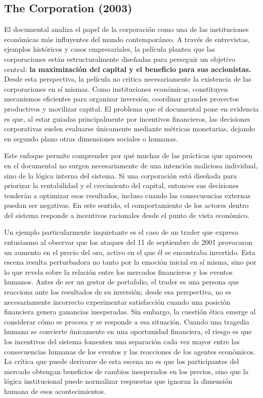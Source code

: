 \subsection{The Corporation (2003)}

El documental analiza el papel de la corporación como una de las instituciones económicas más influyentes del mundo contemporáneo. A través de entrevistas, ejemplos históricos y casos empresariales, la película plantea que las corporaciones están estructuralmente diseñadas para perseguir un objetivo central: \textbf{la maximización del capital y el beneficio para sus accionistas.} Desde esta perspectiva, la película no critica necesariamente la existencia de las corporaciones en sí mismas. Como instituciones económicas, constituyen mecanismos eficientes para organizar inversión, coordinar grandes proyectos productivos y movilizar capital. El problema que el documental pone en evidencia es que, al estar guiadas principalmente por incentivos financieros, las decisiones corporativas suelen evaluarse únicamente mediante métricas monetarias, dejando en segundo plano otras dimensiones sociales o humanas.

Este enfoque permite comprender por qué muchas de las prácticas que aparecen en el documental no surgen necesariamente de una intención maliciosa individual, sino de la lógica interna del sistema. Si una corporación está diseñada para priorizar la rentabilidad y el crecimiento del capital, entonces sus decisiones tenderán a optimizar esos resultados, incluso cuando las consecuencias externas puedan ser negativas. En este sentido, el comportamiento de los actores dentro del sistema responde a incentivos racionales desde el punto de vista económico.

Un ejemplo particularmente inquietante es el caso de un trader que expresa entusiasmo al observar que los ataques del 11 de septiembre de 2001 provocaron un aumento en el precio del oro, activo en el que él se encontraba invertido. Esta escena resulta perturbadora no tanto por la emoción inicial en sí misma, sino por lo que revela sobre la relación entre los mercados financieros y los eventos humanos. Antes de ser un gestor de portafolio, el trader es una persona que reacciona ante los resultados de su inversión; desde esa perspectiva, no es necesariamente incorrecto experimentar satisfacción cuando una posición financiera genera ganancias inesperadas. Sin embargo, la cuestión ética emerge al considerar cómo se procesa y se responde a esa situación. Cuando una tragedia humana se convierte únicamente en una oportunidad financiera, el riesgo es que los incentivos del sistema fomenten una separación cada vez mayor entre las consecuencias humanas de los eventos y las reacciones de los agentes económicos. La crítica que puede derivarse de esta escena no es que los participantes del mercado obtengan beneficios de cambios inesperados en los precios, sino que la lógica institucional puede normalizar respuestas que ignoran la dimensión humana de esos acontecimientos.


